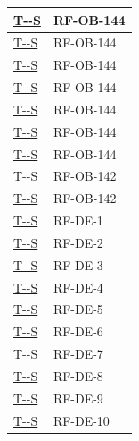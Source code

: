 \documentclass[a4paper,12pt]{article}
\newcounter{testsys}
\newcommand{\systestref}{%
  \hyperlink{T-\arabic{testsys}-S}{T-\arabic{testsys}-S}%
}
\begin{document}
\begin{longtable}{|>{\centering\arraybackslash}p{5cm}|>{\centering\arraybackslash}p{9cm}|}
\stepcounter{testsys}
\systestref & RF-OB-144 \\
\hline

\stepcounter{testsys}
\systestref & RF-OB-144 \\
\hline

\stepcounter{testsys}
\systestref & RF-OB-144 \\
\hline

\stepcounter{testsys}
\systestref & RF-OB-144 \\
\hline



\stepcounter{testsys}
\systestref & RF-OB-144 \\
\hline

\stepcounter{testsys}
\systestref & RF-OB-144 \\
\hline



\stepcounter{testsys}
\systestref & RF-OB-144 \\
\hline

\stepcounter{testsys}
\systestref & RF-OB-142 \\
\hline

\stepcounter{testsys}
\systestref & RF-OB-142 \\
\hline

\stepcounter{testsys}
\systestref & RF-DE-1 \\
\hline

\stepcounter{testsys}
\systestref & RF-DE-2 \\
\hline

\stepcounter{testsys}
\systestref & RF-DE-3 \\
\hline

\stepcounter{testsys}
\systestref & RF-DE-4 \\
\hline

\stepcounter{testsys}
\systestref & RF-DE-5 \\
\hline

\stepcounter{testsys}
\systestref & RF-DE-6 \\
\hline

\stepcounter{testsys}
\systestref & RF-DE-7 \\
\hline

\stepcounter{testsys}
\systestref & RF-DE-8 \\
\hline

\stepcounter{testsys}
\systestref & RF-DE-9 \\
\hline

\stepcounter{testsys}
\systestref & RF-DE-10 \\
\hline


\end{longtable}
\end{document}
